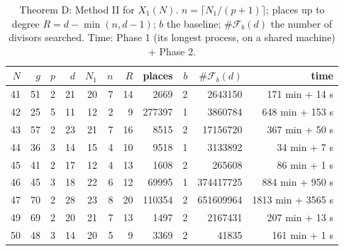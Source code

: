 \begin{table}[ht]\centering\small
\caption{Theorem D: Method II for $X_1(N)$. $n=\lceil N_1/(p+1)\rceil$; places up to degree $R=d-\min(n,d-1)$;
 $b$ the baseline; $\#\mathcal F_b(d)$ the number of divisors searched. Time: Phase 1 (its longest process, on a shared machine) + Phase 2.}\label{tab:D}
\begin{tabular}{rrrrrrrrrrr}\toprule
$N$ & $g$ & $p$ & $d$ & $N_1$ & $n$ & $R$ & places & $b$ & $\#\mathcal F_b(d)$ & time\\\midrule
41 & 51 & 2 & 21 & 20 & 7 & 14 & 2669 & 2 & 2643150 & 171 min + 14 s\\
42 & 25 & 5 & 11 & 12 & 2 & 9 & 277397 & 1 & 3860784 & 648 min + 153 s\\
43 & 57 & 2 & 23 & 21 & 7 & 16 & 8515 & 2 & 17156720 & 367 min + 50 s\\
44 & 36 & 3 & 14 & 15 & 4 & 10 & 9518 & 1 & 3133892 & 34 min + 7 s\\
45 & 41 & 2 & 17 & 12 & 4 & 13 & 1608 & 2 & 265608 & 86 min + 1 s\\
46 & 45 & 3 & 18 & 22 & 6 & 12 & 69995 & 1 & 374417725 & 884 min + 950 s\\
47 & 70 & 2 & 28 & 23 & 8 & 20 & 110354 & 2 & 651609964 & 1813 min + 3565 s\\
49 & 69 & 2 & 20 & 21 & 7 & 13 & 1497 & 2 & 2167431 & 207 min + 13 s\\
50 & 48 & 3 & 14 & 20 & 5 & 9 & 3369 & 2 & 41835 & 161 min + 1 s\\
\bottomrule\end{tabular}\end{table}
